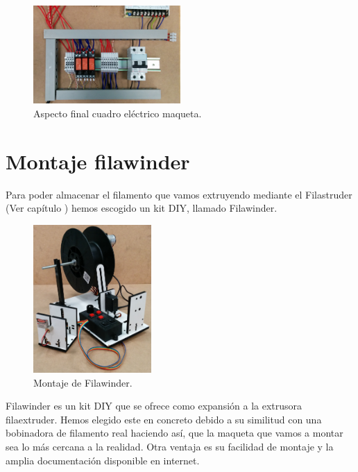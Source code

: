     \begin{figure}[H]
            \centering
            \includegraphics[width=0.5\textwidth]{images/maqueta/IMG_20150331_125243.jpg}
            \caption{Aspecto final cuadro eléctrico maqueta.}
            \label{fig:maque_montaje8}
    \end{figure}



    \section{Montaje filawinder}
Para poder almacenar el filamento que vamos extruyendo mediante el  Filastruder (Ver capítulo ) hemos escogido un kit DIY, llamado Filawinder\cite{filawinder}. 

    \begin{figure}[H]
            \centering
            \includegraphics[width=0.4\textwidth]{images/filawinder/IMG_20150313_103643.jpg}
            \caption{Montaje de Filawinder.}
            \label{fig:winder_winder}
    \end{figure}

Filawinder es un kit DIY que se ofrece como expansión a la extrusora  filaextruder. Hemos elegido este en concreto debido a su similitud con una bobinadora de filamento real haciendo así, que la maqueta que vamos a montar sea lo más cercana a la realidad. Otra ventaja es su facilidad de montaje y la amplia documentación disponible en internet.\\

